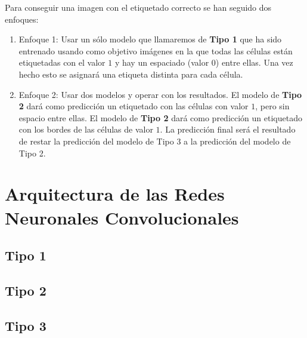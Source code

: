 Para conseguir una imagen con el etiquetado correcto se han seguido dos enfoques:
\begin{enumerate}
\item Enfoque 1: Usar un sólo modelo que llamaremos de \textbf{Tipo 1} que ha sido entrenado usando como objetivo imágenes en la que todas las células están etiquetadas con el valor $ 1 $ y hay un espaciado (valor $ 0 $) entre ellas. Una vez hecho esto se asignará una etiqueta distinta para cada célula.
\item Enfoque 2: Usar dos modelos y operar con los resultados. El modelo de \textbf{Tipo 2} dará como predicción un etiquetado con las células con valor $ 1 $, pero sin espacio entre ellas. El modelo de \textbf{Tipo 2} dará como predicción un etiquetado con los bordes de las células de valor $ 1 $. La predicción final será el resultado de restar la predicción del modelo de Tipo 3 a la predicción del modelo de Tipo 2.
\end{enumerate}

\pagebreak \section{Arquitectura de las Redes Neuronales Convolucionales}\label{sec:cnn_arch}

\subsection{Tipo 1}
\subsection{Tipo 2}
\subsection{Tipo 3}
